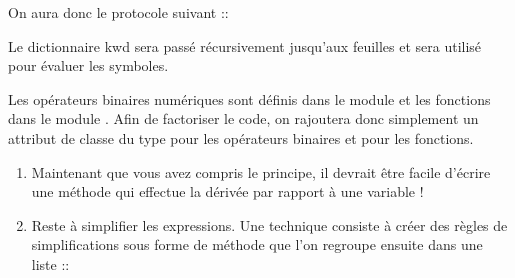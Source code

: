 \documentclass[letterpaper,10pt,english]{sphinxhowto}
\begin{document}
\begin{sphinxVerbatim}[commandchars=\\\{\}]
    
 
\end{sphinxVerbatim}

\sphinxAtStartPar
On aura donc le protocole suivant ::

\begin{sphinxVerbatim}[commandchars=\\\{\}]
  
\end{sphinxVerbatim}

\sphinxAtStartPar
Le dictionnaire kwd sera passé récursivement jusqu’aux feuilles et sera utilisé pour évaluer les symboles.

\sphinxAtStartPar
Les opérateurs binaires numériques sont définis dans le module  et les fonctions dans le module . Afin de factoriser le code, on rajoutera donc simplement un attribut de classe du type  pour les opérateurs binaires et  pour les fonctions.
\begin{enumerate}
%
\setcounter{enumi}{7}
\item {} 
\sphinxAtStartPar
Maintenant que vous avez compris le principe, il devrait être facile d’écrire une méthode  qui effectue la dérivée par rapport à une variable !

\item {} 
\sphinxAtStartPar
Reste à simplifier les expressions. Une technique consiste à créer des règles de simplifications sous forme de méthode que l’on regroupe ensuite dans une liste ::

\end{enumerate}
\end{document}
